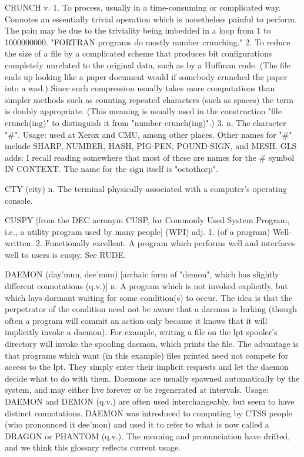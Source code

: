CRUNCH v. 1. To process, usually in a time-consuming or complicated
   way.	 Connotes an essentially trivial operation which is
   nonetheless painful to perform.  The pain may be due to the
   triviality being imbedded in a loop from 1 to 1000000000.  "FORTRAN
   programs do mostly number crunching."  2. To reduce the size of a
   file by a complicated scheme that produces bit configurations
   completely unrelated to the original data, such as by a Huffman
   code.  (The file ends up looking like a paper document would if
   somebody crunched the paper into a wad.)  Since such compression
   usually takes more computations than simpler methods such as
   counting repeated characters (such as spaces) the term is doubly
   appropriate.	 (This meaning is usually used in the construction
   "file crunch(ing)" to distinguish it from "number crunch(ing)".)
   3. n. The character "#".  Usage: used at Xerox and CMU, among other
   places.  Other names for "#" include SHARP, NUMBER, HASH, PIG-PEN,
   POUND-SIGN, and MESH.  GLS adds: I recall reading somewhere that
   most of these are names for the # symbol IN CONTEXT.	 The name for
   the sign itself is "octothorp".

CTY (city) n. The terminal physically associated with a computer's
   operating console.

CUSPY [from the DEC acronym CUSP, for Commonly Used System Program,
   i.e., a utility program used by many people] (WPI) adj. 1. (of a
   program) Well-written.  2. Functionally excellent.  A program which
   performs well and interfaces well to users is cuspy.	 See RUDE.

DAEMON (day'mun, dee'mun) [archaic form of "demon", which has slightly
   different connotations (q.v.)] n. A program which is not invoked
   explicitly, but which lays dormant waiting for some condition(s) to
   occur.  The idea is that the perpetrator of the condition need not
   be aware that a daemon is lurking (though often a program will
   commit an action only because it knows that it will implicitly
   invoke a daemon).  For example, writing a file on the lpt spooler's
   directory will invoke the spooling daemon, which prints the file.
   The advantage is that programs which want (in this example) files
   printed need not compete for access to the lpt.  They simply enter
   their implicit requests and let the daemon decide what to do with
   them.  Daemons are usually spawned automatically by the system, and
   may either live forever or be regenerated at intervals.  Usage:
   DAEMON and DEMON (q.v.) are often used interchangeably, but seem to
   have distinct connotations.	DAEMON was introduced to computing by
   CTSS people (who pronounced it dee'mon) and used it to refer to
   what is now called a DRAGON or PHANTOM (q.v.).  The meaning and
   pronunciation have drifted, and we think this glossary reflects
   current usage.

